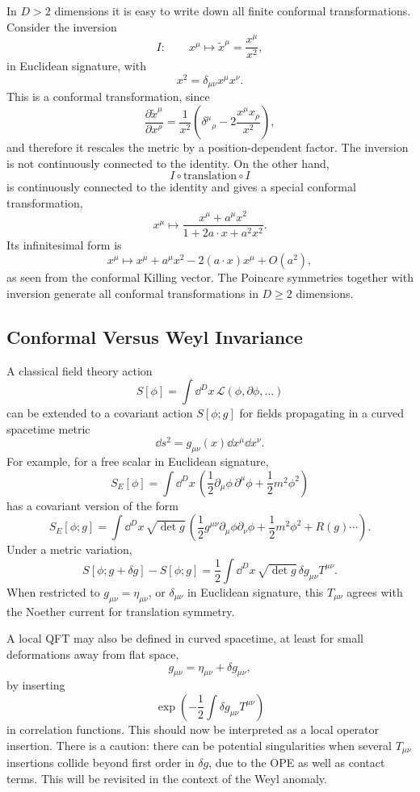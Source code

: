 In \(D>2\) dimensions it is easy to write down all finite conformal
transformations.  Consider the inversion
\[
  I:\qquad x^\mu\mapsto \tilde x^\mu=\frac{x^\mu}{x^2},
\]
in Euclidean signature, with
\[
  x^2=\delta_{\mu\nu}x^\mu x^\nu.
\]
This is a conformal transformation, since
\[
  \frac{\partial\tilde x^\mu}{\partial x^\rho}
  =
  \frac1{x^2}
  \left(\delta^\mu{}_\rho-2\frac{x^\mu x_\rho}{x^2}\right),
\]
and therefore it rescales the metric by a position-dependent factor.
The inversion is not continuously connected to the identity.  On the
other hand,
\[
  I\circ \text{translation}\circ I
\]
is continuously connected to the identity and gives a special conformal
transformation,
\[
  x^\mu\mapsto
  \frac{x^\mu+a^\mu x^2}{1+2a\cdot x+a^2x^2}.
\]
Its infinitesimal form is
\[
  x^\mu\mapsto x^\mu+a^\mu x^2-2(a\cdot x)x^\mu+O(a^2),
\]
as seen from the conformal Killing vector.  The Poincare symmetries
together with inversion generate all conformal transformations in
\(D\geq 2\) dimensions.

\subsection{Conformal Versus Weyl Invariance}

A classical field theory action
\[
  S[\phi]=\int \dd^D x\,\mathcal L(\phi,\partial\phi,\ldots)
\]
can be extended to a covariant action \(S[\phi;g]\) for fields
propagating in a curved spacetime metric
\[
  \dd s^2=g_{\mu\nu}(x)\dd x^\mu\dd x^\nu.
\]
For example, for a free scalar in Euclidean signature,
\[
  S_E[\phi]=\int \dd^D x\,
  \left(\frac12\partial_\mu\phi\,\partial^\mu\phi+\frac12m^2\phi^2\right)
\]
has a covariant version of the form
\[
  S_E[\phi;g]
  =
  \int \dd^D x\,\sqrt{\det g}\,
  \left(\frac12 g^{\mu\nu}\partial_\mu\phi\partial_\nu\phi
  +\frac12m^2\phi^2+R(g)\cdots\right).
\]
Under a metric variation,
\[
  S[\phi;g+\delta g]-S[\phi;g]
  =
  \frac12\int \dd^D x\,\sqrt{\det g}\,
  \delta g_{\mu\nu}T^{\mu\nu}.
\]
When restricted to \(g_{\mu\nu}=\eta_{\mu\nu}\), or \(\delta_{\mu\nu}\)
in Euclidean signature, this \(T_{\mu\nu}\) agrees with the Noether
current for translation symmetry.

A local QFT may also be defined in curved spacetime, at least for small
deformations away from flat space,
\[
  g_{\mu\nu}=\eta_{\mu\nu}+\delta g_{\mu\nu},
\]
by inserting
\[
  \exp\left(-\frac12\int \delta g_{\mu\nu}T^{\mu\nu}\right)
\]
in correlation functions.  This should now be interpreted as a local
operator insertion.  There is a caution: there can be potential
singularities when several \(T_{\mu\nu}\) insertions collide beyond first
order in \(\delta g\), due to the OPE as well as contact terms.  This
will be revisited in the context of the Weyl anomaly.

